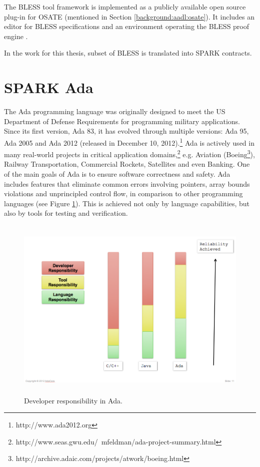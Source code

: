 The BLESS tool framework is implemented as a publicly available open source plug-in for OSATE (mentioned in Section \ref{background:aadl:osate}). It includes an editor for BLESS specifications and an environment operating the BLESS proof engine \cite{Bless:Paper}.

In the work for this thesis, subset of BLESS is translated into SPARK contracts.



\section{SPARK Ada}
\label{background:spark}


The Ada programming language was originally designed to meet the US Department of Defense Requirements for programming military applications. Since its first version, Ada 83, it has evolved through multiple versions: Ada 95, Ada 2005 and Ada 2012 (released in December 10, 2012).\footnote{http://www.ada2012.org} Ada is actively used in many real-world projects in critical application domains,\footnote{http://www.seas.gwu.edu/~mfeldman/ada-project-summary.html} e.g. Aviation (Boeing\footnote{http://archive.adaic.com/projects/atwork/boeing.html}), Railway Transportation, Commercial Rockets, Satellites and even Banking. One of the main goals of Ada is to ensure software correctness and safety. Ada includes features that eliminate common errors involving pointers, array bounds violations and unprincipled control flow, in comparison to other programming languages (see Figure \ref{figure:developer-responsibility-in-ada}). This is achieved not only by language capabilities, but also by tools for testing and verification. 

\begin{figure}[ht]%
    \begin{center}
    	\includegraphics[height=3.5in]{figures/developer_responsibility_in_ada.png}    	
    \end{center}
    \caption{Developer responsibility in Ada.\protect\footnotemark }
    \label{figure:developer-responsibility-in-ada}
\end{figure}

